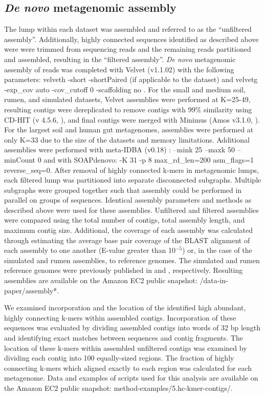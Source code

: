 \documentclass[10pt]{article}
\begin{document}
\subsection*{\emph{De novo} metagenomic assembly}

The lump within each dataset was assembled and referred to as the
``unfiltered assembly''.  Additionally, highly connected sequences
identified as described above were were trimmed from sequencing reads
and the remaining reads partitioned and assembled, resulting in the
``filtered assembly''.  \emph{De novo} metagenomic assembly of reads
was completed with Velvet (v1.1.02) with the following parameters:
velveth -short -shortPaired (if applicable to the dataset) and velvetg
-exp\_cov auto -cov\_cutoff 0 -scaffolding no \cite{Zerbino:2008p665}.
For the small and medium soil, rumen, and simulated datasets, Velvet
assemblies were performed at K=25-49, resulting contigs were
dereplicated to remove contigs with 99\% similarity using CD-HIT (v
4.5.6, \cite{Li:2001p1337}), and final contigs were merged with
Minimus (Amos v3.1.0, \cite{Sommer:2007p1253}).  For the largest soil
and human gut metagenomes, assemblies were performed at only K=33 due
to the size of the datasets and memory limitations.  Additional
assemblies were performed with meta-IDBA (v0.18) \cite{Peng:2011p898}
: --mink 25 --maxk 50 --minCount 0 and with SOAPdenovo: -K 31 -p 8
max\_rd\_len=200 asm\_flags=1 reverse\_seq=0.  After removal of highly
connected k-mers in metagenomic lumps, each filtered lump was
partitioned into separate disconnected subgraphs.  Multiple subgraphs
were grouped together such that assembly could be performed in
parallel on groups of sequences.  Identical assembly parameters and
methods as described above were used for these assemblies.  Unfiltered
and filtered assemblies were compared using the total number of
contigs, total assembly length, and maximum contig size.  Additional,
the coverage of each assembly was calculated through estimating the
average base pair coverage of the BLAST alignment of each assembly to
one another (E-value greater than 10$^{-5}$) or, in the case of the
simulated and rumen assemblies, to reference genomes.  The simulated
and rumen reference genomes were previously published in
\cite{Hess:2011p686} and \cite{Pignatelli:2011p742}, respectively.
Resulting assemblies are available on the Amazon EC2 public snapshot:
/data-in-paper/assembly*.

We examined incorporation and the location of the identified high
abundant, highly connecting k-mers within assembled contigs.
Incorporation of these sequences was evaluated by dividing assembled
contigs into words of 32 bp length and identifying exact matches
between sequences and contig fragments.  The location of these k-mers
within assembled unfiltered contigs was examined by dividing each
contig into 100 equally-sized regions.  The fraction of highly
connecting k-mers which aligned exactly to each region was calculated
for each metagenome. Data and examples of scripts used for this
analysis are available on the Amazon EC2 public snapshot:
method-examples/5.hc-kmer-contigs/.
\end{document}
